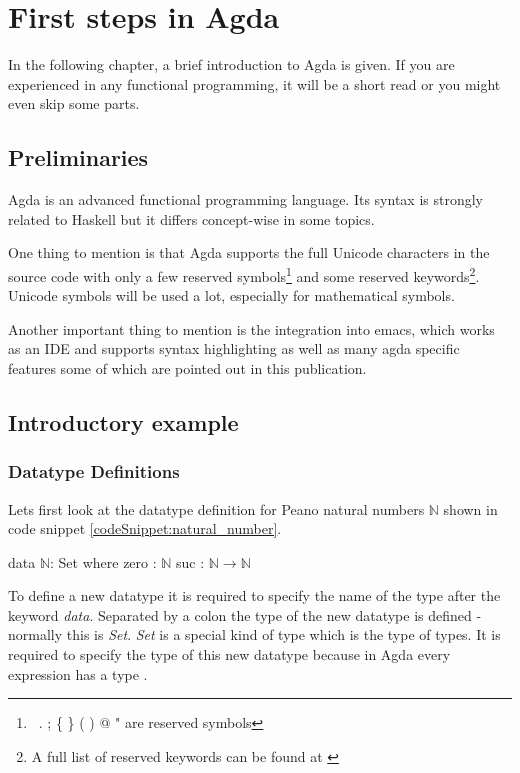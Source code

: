 \section{First steps in Agda}\label{section:first_steps_in_agda}
In the following chapter, a brief introduction to Agda is given. If you are experienced in any functional programming, it will be a short read or you might even skip some parts.

\subsection{Preliminaries}
Agda is an advanced functional programming language. Its syntax is strongly related to Haskell but it differs concept-wise in some topics. 

One thing to mention is that Agda supports the full Unicode characters in the source code with only a few reserved symbols\footnote{\, . ; \{ \} ( ) @ " are reserved symbols\cite{AgdaReadTheDocsStructure}} 
and some reserved keywords\footnote{A full list of reserved keywords can be found at \cite{AgdaReadTheDocsStructure}}. 
Unicode symbols will be used a lot, especially for mathematical symbols.

Another important thing to mention is the integration into emacs, which works as an IDE and supports syntax highlighting as well as many agda specific features some of which are pointed out in this publication.

\subsection{Introductory example}\label{section:agda_introduction_example}
\subsubsection{Datatype Definitions}
Lets first look at the datatype definition for Peano natural numbers $\mathbb{N}$ shown in code snippet \ref{codeSnippet:natural_number}.

\begin{codesnippet}[mathescape=true, caption={Definition of the peano natural numbers datatype in Agda}, label={codeSnippet:natural_number}]
data $\mathbb{N}$: Set where
  zero : $\mathbb{N}$
  suc  : $\mathbb{N} \rightarrow \mathbb{N}$
\end{codesnippet}

To define a new datatype it is required to specify the name of the type after the keyword \emph{data}.
Separated by a colon the type of the new datatype is defined - normally this is \emph{Set}.
\emph{Set} is a special kind of type which is the type of types.
It is required to specify the type of this new datatype because in Agda every expression has a type \cite{10.1145/2841316}.

